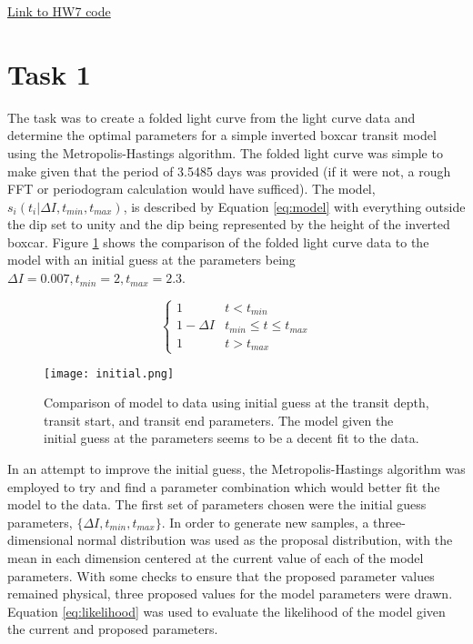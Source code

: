 \documentclass{article}
\begin{document}
\large

\href{https://github.com/markoris/ASTP720/tree/master/HW7}{Link to HW7 code}

\section{Task 1}
%
The task was to create a folded light curve from the light curve data and determine the optimal parameters for a simple inverted boxcar transit model using the Metropolis-Hastings algorithm. The folded light curve was simple to make given that the period of 3.5485 days was provided (if it were not, a rough FFT or periodogram calculation would have sufficed). The model, $s_i(t_i | \Delta I, t_{min}, t_{max})$, is described by Equation \ref{eq:model} with everything outside the dip set to unity and the dip being represented by the height of the inverted boxcar. Figure \ref{fig:init} shows the comparison of the folded light curve data to the model with an initial guess at the parameters being $\Delta I = 0.007, t_{min} = 2, t_{max} = 2.3$.

\begin{equation}
\begin{cases}
	1 & t < t_{min} \\
	1 - \Delta I & t_{min} \leq t \leq t_{max} \\
	1 & t > t_{max}
\end{cases}
\label{eq:model}
\end{equation}

\begin{figure}[ht!]
\texttt{[image: initial.png]}
\caption{Comparison of model to data using initial guess at the transit depth, transit start, and transit end parameters. The model given the initial guess at the parameters seems to be a decent fit to the data.}
\label{fig:init}
\end{figure}

\noindent In an attempt to improve the initial guess, the Metropolis-Hastings algorithm was employed to try and find a parameter combination which would better fit the model to the data. The first set of parameters chosen were the initial guess parameters, $\{\Delta I, t_{min}, t_{max}\}$. In order to generate new samples, a three-dimensional normal distribution was used as the proposal distribution, with the mean in each dimension centered at the current value of each of the model parameters. With some checks to ensure that the proposed parameter values remained physical, three proposed values for the model parameters were drawn. Equation \ref{eq:likelihood} was used to evaluate the likelihood of the model given the current and proposed parameters.
\end{document}
